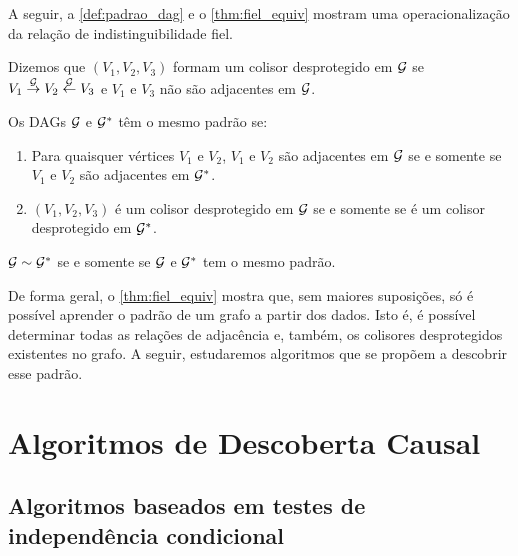 A seguir, a \cref{def:padrao_dag} e
o \cref{thm:fiel_equiv} mostram 
uma operacionalização da 
relação de indistinguibilidade fiel.

\begin{definition}
 \label{def:colisor_desprotegido}
 Dizemos que $(V_1, V_2, V_3)$ formam
 um colisor desprotegido em ${\mathcal G}$ se
 $V_1 \stackrel{{\mathcal G}}{\rightarrow} V_2
 \stackrel{{\mathcal G}}{\leftarrow} V_3$ e
 $V_1$ e $V_3$ não são adjacentes em ${\mathcal G}$.
\end{definition}

\begin{definition}
 \label{def:padrao_dag}
 Os DAGs ${\mathcal G}$ e ${\mathcal G}^*$ têm o mesmo padrão se:
 \begin{enumerate}
  \item Para quaisquer vértices $V_1$ e $V_2$,
  $V_1$ e $V_2$ são adjacentes em ${\mathcal G}$ 
  se e somente se
  $V_1$ e $V_2$ são adjacentes em ${\mathcal G}^*$.
  \item $(V_1, V_2, V_3)$ é um colisor desprotegido em ${\mathcal G}$
  se e somente se é um colisor desprotegido em ${\mathcal G}^*$.
 \end{enumerate}
\end{definition}

\begin{theorem}
 \label{thm:fiel_equiv}
 ${\mathcal G} \sim {\mathcal G}^*$ se e somente se
 ${\mathcal G}$ e ${\mathcal G}^*$ tem o mesmo padrão.
\end{theorem}

De forma geral, 
o \cref{thm:fiel_equiv} mostra que,
sem maiores suposições,
só é possível aprender 
o padrão de um grafo a partir dos dados.
Isto é, é possível determinar todas
as relações de adjacência e, também,
os colisores desprotegidos existentes no grafo.
A seguir, estudaremos algoritmos que
se propõem a descobrir esse padrão.

\section{Algoritmos de Descoberta Causal}

\subsection{Algoritmos baseados em testes de independência condicional}


